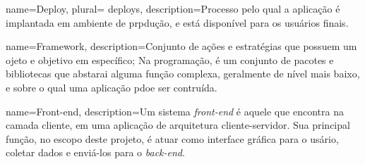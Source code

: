 



    
    
 {
    name=Deploy,
    plural= {deploys},
    description={Processo pelo qual a aplicação é implantada em ambiente
  de prpdução, e está disponível para os usuários finais.}
}

 {
    name=Framework,
    description={Conjunto de ações e estratégias que possuem um ojeto e objetivo em específico;
    Na programação, é um conjunto de pacotes e bibliotecas que abstarai
    alguma função complexa, geralmente de nível mais baixo, e sobre o
    qual uma aplicação pdoe ser contruída.}
}

 {
    name={Front-end},
    description={Um sistema \emph{front-end} é aquele que encontra na
    camada cliente, em uma aplicação de arquitetura cliente-servidor. Sua
    principal função, no escopo deste projeto, é atuar como interface
    gráfica para o usário, coletar dados e enviá-los para o \emph{back-end}.}
}    
                

